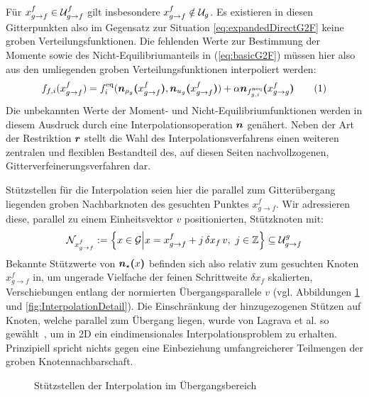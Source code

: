 Für \(x_{g \to f}^f \in \mathcal{U}_{g \to f}^f\) gilt insbesondere \(x_{g \to f}^f \notin \mathcal{U}_g\). Es existieren in diesen Gitterpunkten also im Gegensatz zur Situation \ref{eq:expandedDirectG2F} keine groben Verteilungsfunktionen. Die fehlenden Werte zur Bestimmung der Momente sowie des Nicht-Equilibriumanteils in (\ref{eq:basicG2F}) müssen hier also aus den umliegenden groben Verteilungsfunktionen interpoliert werden:
\[f_{f,i}(x_{g \to f}^f) = f_i^\text{eq}(\ipolarg{\rho_g}{x_{g \to f}^f}, \ipolarg{u_g}{x_{g \to f}^f}) + \alpha \ipolarg{f_{g,i}^\text{neq}}{x_{g \to g}^f} \numberthis\label{eq:expandedInterpolG2F}\]
Die unbekannten Werte der Moment- und Nicht-Equilibriumfunktionen werden in diesem Ausdruck durch eine Interpolationsoperation \(\operatorname{\boldsymbol{n}}\) genähert. Neben der Art der Restriktion \(\operatorname{\boldsymbol{r}}\) stellt die Wahl des Interpolationsverfahrens einen weiteren zentralen und flexiblen Bestandteil des, auf diesen Seiten nachvollzogenen, Gitterverfeinerungsverfahren dar.

\bigskip

Stützstellen für die Interpolation seien hier die parallel zum Gitterübergang liegenden groben Nachbarknoten des gesuchten Punktes \(x_{g \to f}^f\). Wir adressieren diese, parallel zu einem Einheitsvektor \(v\) positionierten, Stützknoten mit:
\[\mathcal{N}_{x_{g \to f}^f} := \left\{x \in \mathcal{G} \middle| x = x_{g \to f}^f + j \, \delta x_f \, v,\ j \in \mathbb{Z} \right\} \subseteq \mathcal{U}_{g \to f}^g\]
Bekannte Stützwerte von \(\boldsymbol{n}_{\star}\boldsymbol{(}{x}\boldsymbol{)}\) befinden sich also relativ zum gesuchten Knoten \(x_{g \to f}^f\) in, um ungerade Vielfache der feinen Schrittweite \(\delta x_f\) skalierten, Verschiebungen entlang der normierten Übergangsparallele \(v\) (vgl. Abbildungen \ref{fig:InterpolationBasis} und \ref{fig:InterpolationDetail}). Die Einschränkung der hinzugezogenen Stützen auf Knoten, welche parallel zum Übergang liegen, wurde von Lagrava et al. so gewählt~\cite[Kap.~3.6]{Lagrava12}, um in 2D ein eindimensionales Interpolationsproblem zu erhalten. Prinzipiell spricht nichts gegen eine Einbeziehung umfangreicherer Teilmengen der groben Knotennachbarschaft.

\begin{figure}[h]
\centering

\caption{Stützstellen der Interpolation im Übergangsbereich}
\label{fig:InterpolationBasis}
\end{figure}

